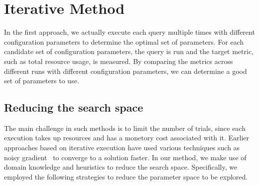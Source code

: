 \section{Iterative Method} \label{section:iter}
In the first approach, we actually execute each query multiple times with different configuration parameters to determine the optimal set of parameters. For each candidate set of configuration parameters, the query is run and the target metric, such as total resource usage, is measured. By comparing the metrics across different runs with different configuration parameters, we can determine a good set of parameters to use. 

\subsection{Reducing the search space}
The main challenge in such methods is to limit the number of trials, since each execution takes up resources and has a monetory cost associated with it. Earlier approaches based on iterative execution have used various techniques such as noisy gradient~\cite{} to converge to a solution faster. In our method, we make use of domain knowledge and heuristics to reduce the search space. Specifically, we employed the following strategies to reduce the parameter space to be explored.

